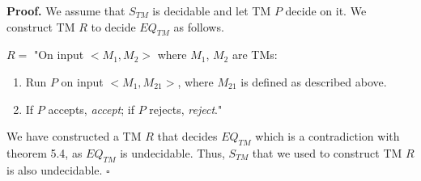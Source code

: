 \documentclass[a4paper, notitlepage]{article}
\begin{document}
\textbf{Proof.} We assume that $S_{TM}$ is decidable and let TM $P$ decide on it. We construct TM $R$ to decide $EQ_{TM}$ as follows.\newline

$R = $ "On input $<M_1, M_2>$ where $M_1$, $M_2$ are TMs:
\begin{enumerate}
\item Run $P$ on input $<M_1, M_{21}>$, where $M_{21}$ is defined as described above.
\item If $P$ accepts, \emph{accept}; if $P$ rejects, \emph{reject}."
\end{enumerate}

We have constructed a TM $R$ that decides $EQ_{TM}$ which is a contradiction with theorem 5.4, as $EQ_{TM}$ is undecidable. Thus, $S_{TM}$ that we used to construct TM $R$ is also undecidable. $\square$
\end{document}
